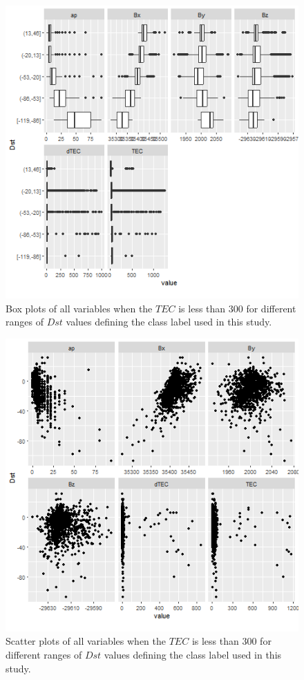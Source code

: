 \documentclass[sn-mathphys-num]{sn-jnl}%
\begin{document}
\begin{figure}
    \centering
    \includegraphics[width=0.9\linewidth]{iono3boxplot.png}
    \caption{Box plots of all variables when the $TEC$ is less than $300$ for different ranges of $Dst$ values defining the class label used in this study.}
    \label{fig:iono3boxplot}
\end{figure}

\begin{figure}
    \centering
    \includegraphics[width=0.9\linewidth]{iono3scatterplot.png}
    \caption{Scatter plots of all variables when the $TEC$ is less than $300$ for different ranges of $Dst$ values defining the class label used in this study.}
    \label{fig:iono3scatterplot}
\end{figure}
\end{document}

